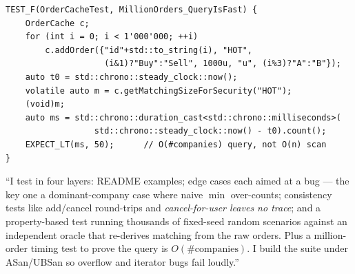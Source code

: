 \begin{lstlisting}
TEST_F(OrderCacheTest, MillionOrders_QueryIsFast) {
    OrderCache c;
    for (int i = 0; i < 1'000'000; ++i)
        c.addOrder({"id"+std::to_string(i), "HOT",
                    (i&1)?"Buy":"Sell", 1000u, "u", (i%3)?"A":"B"});
    auto t0 = std::chrono::steady_clock::now();
    volatile auto m = c.getMatchingSizeForSecurity("HOT");
    (void)m;
    auto ms = std::chrono::duration_cast<std::chrono::milliseconds>(
                  std::chrono::steady_clock::now() - t0).count();
    EXPECT_LT(ms, 50);      // O(#companies) query, not O(n) scan
}
\end{lstlisting}

\begin{say}
``I test in four layers: README examples; edge cases each aimed at a bug --- the
key one a dominant-company case where naive $\min$ over-counts; consistency tests
like add/cancel round-trips and \emph{cancel-for-user leaves no trace}; and a
property-based test running thousands of fixed-seed random scenarios against an
independent oracle that re-derives matching from the raw orders. Plus a
million-order timing test to prove the query is $O(\#\text{companies})$. I build the
suite under ASan/UBSan so overflow and iterator bugs fail loudly.''
\end{say}
